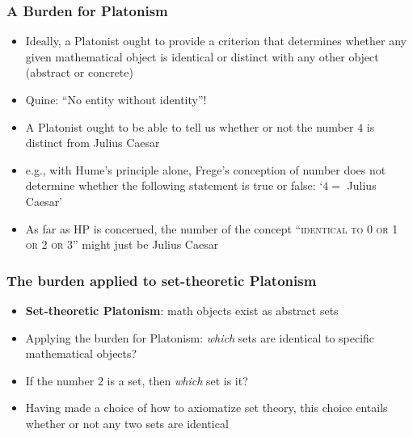 \begin{frame}
\frametitle{A Burden for Platonism}

\begin{itemize}[<+->]

\item Ideally, a Platonist ought to provide a criterion that determines whether any given mathematical object is identical or distinct with any other object (abstract or concrete)

\item Quine: ``No entity without identity''!


\item A Platonist ought to be able to tell us whether or not the number $4$ is distinct from Julius Caesar

\item e.g., with Hume's principle alone, Frege's conception of number does not determine whether the following statement is true or false: `$ 4 = $ Julius Caesar'

\item As far as HP is concerned, the number of the concept ``\textsc{identical to 0 or 1 or 2 or 3}'' might just be Julius Caesar

\end{itemize}
\end{frame}

\begin{frame}
\frametitle{The burden applied to set-theoretic Platonism}

\begin{itemize}[<+->]

\item \textbf{Set-theoretic Platonism}: math objects exist as abstract sets

\item Applying the burden for Platonism: \textit{which} sets are identical to specific mathematical objects? 

\item If the number $2$ is a set, then \textit{which} set is it? 

\item Having made a choice of how to axiomatize set theory, this choice entails whether or not any two sets are identical

\end{itemize}
\end{frame}

